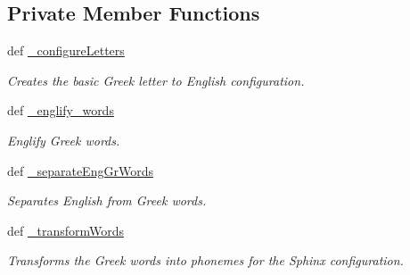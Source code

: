 \subsection*{Private Member Functions}
\begin{DoxyCompactItemize}
\item 
def \hyperlink{classrapp__speech__detection__sphinx4_1_1greek__support_1_1GreekSupport_ac5823a37a949ba4bf9669906913e064b}{\-\_\-configure\-Letters}
\begin{DoxyCompactList}\small\item\em Creates the basic Greek letter to English configuration. \end{DoxyCompactList}\item 
def \hyperlink{classrapp__speech__detection__sphinx4_1_1greek__support_1_1GreekSupport_a26445e371062313c7e1a7a04562a3bf7}{\-\_\-englify\-\_\-words}
\begin{DoxyCompactList}\small\item\em Englify Greek words. \end{DoxyCompactList}\item 
def \hyperlink{classrapp__speech__detection__sphinx4_1_1greek__support_1_1GreekSupport_ac38f1a62d970abe4a373bda19160ccd9}{\-\_\-separate\-Eng\-Gr\-Words}
\begin{DoxyCompactList}\small\item\em Separates English from Greek words. \end{DoxyCompactList}\item 
def \hyperlink{classrapp__speech__detection__sphinx4_1_1greek__support_1_1GreekSupport_ac7e3b9ebc81d7c52b0892edf79ae5edc}{\-\_\-transform\-Words}
\begin{DoxyCompactList}\small\item\em Transforms the Greek words into phonemes for the Sphinx configuration. \end{DoxyCompactList}\end{DoxyCompactItemize}
